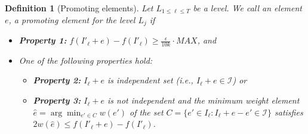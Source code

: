 \documentclass[11pt]{article}
\newtheorem{definition}{Definition}[section]
\newcommand{\mI}{{\mathcal{I}}}
\begin{document}
\begin{tcolorbox}[width=\linewidth, colback=white!80!gray,boxrule=0pt,frame hidden, sharp corners]

\begin{definition}[Promoting elements]
\label{def:promote}
Let $L_{1 \le \ell \le T}$ be a level.
We call an element $e$, a promoting element for the level $L_j$  if 
\begin{itemize}
    \item \textbf{Property 1:} $f(I'_{\ell} + e) - f(I'_{\ell}) \ge \frac{\epsilon}{10k}\cdot MAX$, and 
    \item One of the following properties hold: 
        \begin{itemize}
            \item \textbf{Property 2: } $I_{\ell} + e$ is independent set (i.e., $I_{\ell}+e \in \mathcal{I}$) \emph{or}
            \item \textbf{Property 3: } $I_{\ell}+e$ is not independent and
            the minimum weight element $\hat{e} = \arg\min_{e' \in C} w(e')$ of 
            the set $C = \{ e' \in I_{\ell}: I_{\ell} + e - e' \in \mI\}$ satisfies 
            $2w(\hat{e}) \le {f(I'_{\ell} + e) - f(I'_{\ell})}$. 
        \end{itemize}    
\end{itemize}
\end{definition}

\end{tcolorbox}
\end{document}
